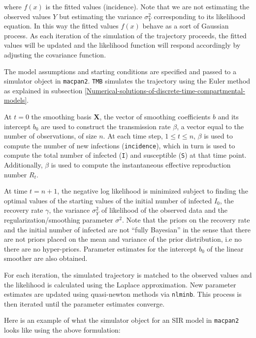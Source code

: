 \documentclass[
11pt, %
oneside, %
english, %
singlespacing, %
]{macthesis} %
\begin{document}
where \(f(x)\) is the fitted values (incidence). Note that
we are not estimating the observed values \(Y\) but estimating the variance \(\sigma^2_Y\) corresponding to its likelihood equation. In this way the fitted values \(f(x)\) behave as a sort of Gaussian process. As each iteration of the simulation of the trajectory proceeds, the fitted values will be updated and the likelihood function will respond accordingly by adjusting the covariance function.

The model assumptions and starting conditions are specified and passed to a simulator object in \texttt{macpan2}. \texttt{TMB} simulates the trajectory using the Euler method as explained in subsection \ref{Numerical-solutions-of-discrete-time-compartmental-models}.

At \(t= 0\) the smoothing basis \(\mathbf{X}\), the vector of smoothing coefficients \(b\) and its intercept \(b_0\) are used to construct the transmission rate \(\beta\), a vector equal to the number of observations, of size \(n\). At each time step, \(1 \leq t \leq n\), \(\beta\) is used to compute the number of new infections (\texttt{incidence}), which in turn is used to compute the total number of infected (\texttt{I}) and susceptible (\texttt{S}) at that time point. Additionally, \(\beta\) is used to compute the instantaneous effective reproduction number \(R_t\).

At time \(t = n+1\), the negative log likelihood is minimized subject to finding the optimal values of the starting values of the initial number of infected \(I_0\), the recovery rate \(\gamma\), the variance \(\sigma^2_Y\) of likelihood of the observed data and the regularization/smoothing parameter \(\sigma^2\). Note that the priors on the recovery rate and the initial number of infected are not ``fully Bayesian'' in the sense that there are not priors placed on the mean and variance of the prior distribution, i.e no there are no hyper-priors. Parameter estimates for the intercept \(b_0\) of the linear smoother are also obtained.

For each iteration, the simulated trajectory is matched to the observed values and the likelihood is calculated using the Laplace approximation. New parameter estimates are updated using quasi-newton methods via \texttt{nlminb}. This process is then iterated until the parameter estimates converge.

Here is an example of what the simulator object for an SIR model in \texttt{macpan2} looks like using the above formulation:
\end{document}
